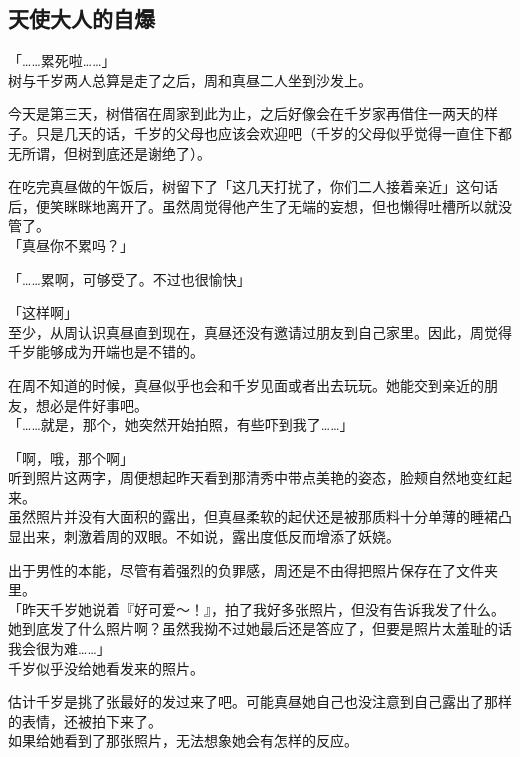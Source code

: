 \subsection{天使大人的自爆}

「……累死啦……」\\

树与千岁两人总算是走了之后，周和真昼二人坐到沙发上。

今天是第三天，树借宿在周家到此为止，之后好像会在千岁家再借住一两天的样子。只是几天的话，千岁的父母也应该会欢迎吧（千岁的父母似乎觉得一直住下都无所谓，但树到底还是谢绝了）。

在吃完真昼做的午饭后，树留下了「这几天打扰了，你们二人接着亲近」这句话后，便笑眯眯地离开了。虽然周觉得他产生了无端的妄想，但也懒得吐槽所以就没管了。\\

「真昼你不累吗？」

「……累啊，可够受了。不过也很愉快」

「这样啊」\\

至少，从周认识真昼直到现在，真昼还没有邀请过朋友到自己家里。因此，周觉得千岁能够成为开端也是不错的。

在周不知道的时候，真昼似乎也会和千岁见面或者出去玩玩。她能交到亲近的朋友，想必是件好事吧。\\

「……就是，那个，她突然开始拍照，有些吓到我了……」

「啊，哦，那个啊」\\

听到照片这两字，周便想起昨天看到那清秀中带点美艳的姿态，脸颊自然地变红起来。\\

虽然照片并没有大面积的露出，但真昼柔软的起伏还是被那质料十分单薄的睡裙凸显出来，刺激着周的双眼。不如说，露出度低反而增添了妖娆。

出于男性的本能，尽管有着强烈的负罪感，周还是不由得把照片保存在了文件夹里。\\

「昨天千岁她说着『好可爱～！』，拍了我好多张照片，但没有告诉我发了什么。她到底发了什么照片啊？虽然我拗不过她最后还是答应了，但要是照片太羞耻的话我会很为难……」\\

千岁似乎没给她看发来的照片。

估计千岁是挑了张最好的发过来了吧。可能真昼她自己也没注意到自己露出了那样的表情，还被拍下来了。\\

如果给她看到了那张照片，无法想象她会有怎样的反应。

